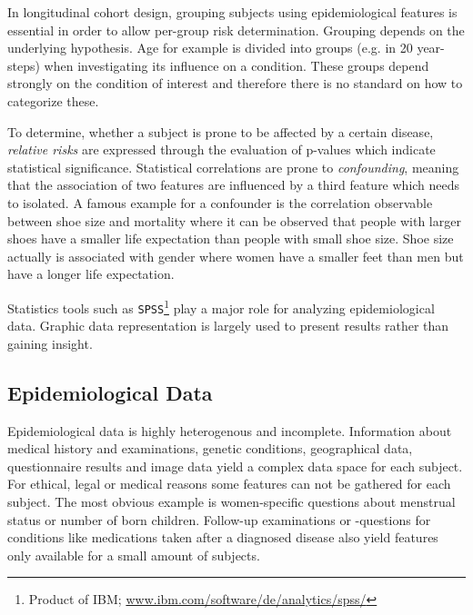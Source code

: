 \documentclass[journal]{style/vgtc} 			          %
\begin{document}
In longitudinal cohort design, grouping subjects using epidemiological features is essential in order to allow per-group risk determination.
%
Grouping depends on the underlying hypothesis.
%
Age for example is divided into groups (e.g. in 20 year-steps) when investigating its influence on a condition.
%
These groups depend strongly on the condition of interest and therefore there is no standard on how to categorize these.

To determine, whether a subject is prone to be affected by a certain disease, \emph{relative risks} are expressed through the evaluation of p-values which indicate statistical significance.
%
Statistical correlations are prone to \emph{confounding}, meaning that the association of two features are influenced by a third feature which needs to isolated.
%
A famous example for a confounder is the correlation observable between shoe size and mortality where it can be observed that people with larger shoes have a smaller life expectation than people with small shoe size.
%
Shoe size actually is associated with gender where women have a smaller feet than men but have a longer life expectation.
%

Statistics tools such as \texttt{SPSS}\footnote{Product of IBM; \url{www.ibm.com/software/de/analytics/spss/}} play a major role for analyzing epidemiological data.
%
Graphic data representation is largely used to present results rather than gaining insight.
	
\subsection{Epidemiological Data} \label{EpidemiologicalData}
Epidemiological data is highly heterogenous and incomplete.
%
Information about medical history and examinations, genetic conditions, geographical data, questionnaire results and image data yield a complex data space for each subject.
%
%
For ethical, legal or medical reasons some features can not be gathered for each subject.
%
The most obvious example is women-specific questions about menstrual status or number of born children.
%
Follow-up examinations or -questions for conditions like medications taken after a diagnosed disease also yield features only available for a small amount of subjects.
%
\end{document}

